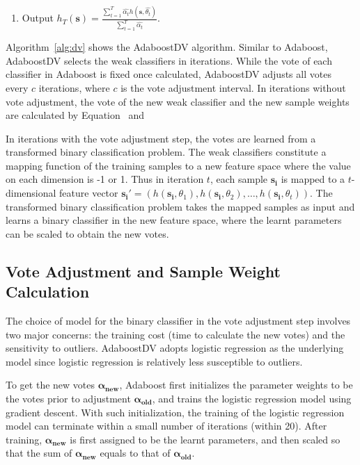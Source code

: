 \begin{algorithm}[h]
\begin{enumerate}
		\item
		Output $h_T(\boldsymbol{s}) = \frac{\sum_{t = 1}^T \hat{\alpha_t} h(\boldsymbol{s}, \hat{\theta_t})}{\sum_{t = 1}^T \hat{\alpha_t}}$.
	\end{enumerate}
\end{algorithm}

Algorithm~\ref{alg:dv} shows the AdaboostDV algorithm.
Similar to Adaboost, AdaboostDV selects the weak classifiers in iterations. While the vote of each classifier in Adaboost is fixed once calculated, AdaboostDV adjusts all votes every $c$ iterations, where $c$ is the vote adjustment interval. In iterations without vote adjustment, the vote of the new weak classifier and the new sample weights are calculated by Equation~%
and %

In iterations with the vote adjustment step, the votes are learned from a transformed binary classification problem. The weak classifiers constitute a mapping function of the training samples to a new feature space where the value on each dimension is -1 or 1. Thus in iteration $t$, each sample $\boldsymbol{s_i}$ is mapped to a $t$-dimensional feature vector $\boldsymbol{s_i'} = (h(\boldsymbol{s_i},\theta_1), h(\boldsymbol{s_i},\theta_2), \dots, h(\boldsymbol{s_i},\theta_t))$. The transformed binary classification problem takes the mapped samples as input and learns a binary classifier in the new feature space, where the learnt parameters can be scaled to obtain the new votes.

\subsection{Vote Adjustment and Sample Weight Calculation}
The choice of model for the binary classifier in the vote adjustment step involves two major concerns: the training cost (time to calculate the new votes) and the sensitivity to outliers. AdaboostDV adopts logistic regression as the underlying model since logistic regression is relatively less susceptible to outliers.

To get the new votes $\boldsymbol{\alpha_{new}}$, Adaboost first initializes the parameter weights to be the votes prior to adjustment $\boldsymbol{\alpha_{old}}$, and trains the logistic regression model using gradient descent. With such initialization, the training of the logistic regression model can terminate within a small number of iterations (within 20). After training, $\boldsymbol{\alpha_{new}}$ is first assigned to be the learnt parameters, and then scaled so that the sum of $\boldsymbol{\alpha_{new}}$ equals to that of $\boldsymbol{\alpha_{old}}$. 

